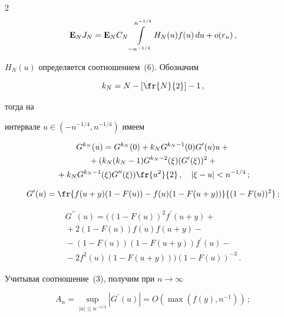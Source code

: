 \begin{multicols}{2}
\begin{equation}
{\bf E}_NJ_N={\bf E}_NC_N\int\limits_{-n^{-1/4}}^{n^{-1/4}}H_N(u)f(u)\,du+o(r_n)\,,


\label{9}


\end{equation}


$H_N(u)$ определяется соотношением~(6). Обозначим


\begin{equation}


k_{N}=N-\left[\fr{N}{2}\right]-1\,, \label{10}


\end{equation}  


тогда на


интервале $u\in (-n^{-1/4},n^{-1/4}) $ имеем


\begin{multline}


G^{k_{N}}(u)=G^{k_{N}}(0)+k_{N}G^{k_{N}-1}(0)G^{\prime}(u)u+{}\\


{}+(k_{N}(k_{N}-1)G^{k_{N}-2}(\xi) (G^{\prime}(\xi))^2+{}\\


{}+k_{N}G^{k_{N}-1}(\xi)G^{\prime \prime}(\xi))\fr{u^2}{2}\,, \quad


|\xi-u|<n^{-1/4}\,; \label{11}


\end{multline}


$$


G^{\prime}(u)=\fr{f(u+y)(1-F(u))-f(u)(1-F(u+y))}{(1-F(u))^2}\,;


$$


\begin{multline*}


G^{\prime \prime}(u)=((1-F(u))^2f^{\prime}(u+y)+{}\\


{}+2(1-F(u))f(u)f(u+y)-{}\\


{}-(1-F(u))(1-F(u+y))f^{\prime} (u)-{}\\


{}- 2f^2(u)(1-F(u+y)))(1-F(u))^{-3}\,.


\end{multline*} 


Учитывая соотношение~(3), получим при $n \to \infty$ 


\begin{equation}


A_n=\sup_{|u|\leq n^{-1/4}}|G^{\prime}(u)|=O(\max (f(y),n^{-1}))\,; 



\end{equation}
\end{multicols}

